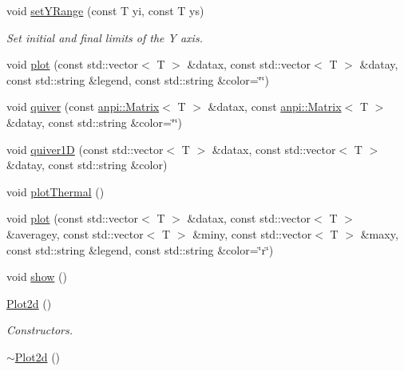 \begin{DoxyCompactItemize}
void \hyperlink{classanpi_1_1Plot2d_a5bac0f99358cd81f048cc5c5bc69ffda}{set\+Y\+Range} (const T yi, const T ys)
\begin{DoxyCompactList}\small\item\em Set initial and final limits of the Y axis. \end{DoxyCompactList}\item 
void \hyperlink{classanpi_1_1Plot2d_a0b04dd4c40f9f623789fa688bd3c593d}{plot} (const std\+::vector$<$ T $>$ \&datax, const std\+::vector$<$ T $>$ \&datay, const std\+::string \&legend, const std\+::string \&color=\char`\"{}\char`\"{})
\item 
void \hyperlink{classanpi_1_1Plot2d_ab2d6160a61a3c1173588765eeccb0491}{quiver} (const \hyperlink{classanpi_1_1Matrix}{anpi\+::\+Matrix}$<$ T $>$ \&datax, const \hyperlink{classanpi_1_1Matrix}{anpi\+::\+Matrix}$<$ T $>$ \&datay, const std\+::string \&color=\char`\"{}\char`\"{})
\item 
void \hyperlink{classanpi_1_1Plot2d_ad70dc094e12bc263dc196c1b96656f47}{quiver1D} (const std\+::vector$<$ T $>$ \&datax, const std\+::vector$<$ T $>$ \&datay, const std\+::string \&color)
\item 
void \hyperlink{classanpi_1_1Plot2d_aea73e92ff640dc6e16fbe0fd3e588667}{plot\+Thermal} ()
\item 
void \hyperlink{classanpi_1_1Plot2d_ad7978a6d763c92036ca249982a041dd1}{plot} (const std\+::vector$<$ T $>$ \&datax, const std\+::vector$<$ T $>$ \&averagey, const std\+::vector$<$ T $>$ \&miny, const std\+::vector$<$ T $>$ \&maxy, const std\+::string \&legend, const std\+::string \&color=\char`\"{}r\char`\"{})
\item 
void \hyperlink{classanpi_1_1Plot2d_a41165ac70edb258fa0fbcce04ddf7025}{show} ()
\end{DoxyCompactItemize}
\textbf{ }\par
\begin{DoxyCompactItemize}
\item 
\hyperlink{classanpi_1_1Plot2d_a0d7d01999364a90882de6b19bdd0245b}{Plot2d} ()
\begin{DoxyCompactList}\small\item\em Constructors. \end{DoxyCompactList}\item 
\hyperlink{classanpi_1_1Plot2d_a0a9ba35b064aef73a9c6f601b2345734}{$\sim$\+Plot2d} ()
\end{DoxyCompactItemize}

